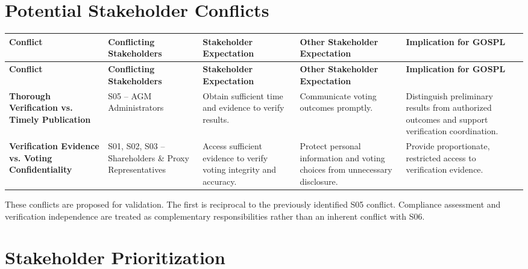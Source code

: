 \documentclass[11pt,a4paper]{article}
\begin{document}
\section*{Potential Stakeholder Conflicts}

\begingroup\small
\begin{longtable}{@{}>{\raggedright\arraybackslash}p{}>{\raggedright\arraybackslash}p{}>{\raggedright\arraybackslash}p{}>{\raggedright\arraybackslash}p{}>{\raggedright\arraybackslash}p{}@{}}
\toprule
\textbf{Conflict} & \textbf{Conflicting Stakeholders} & \textbf{Stakeholder Expectation} & \textbf{Other Stakeholder Expectation} & \textbf{Implication for GOSPL} \\
\midrule
\endfirsthead
\toprule
\textbf{Conflict} & \textbf{Conflicting Stakeholders} & \textbf{Stakeholder Expectation} & \textbf{Other Stakeholder Expectation} & \textbf{Implication for GOSPL} \\
\midrule
\endhead
\bottomrule
\endfoot
\textbf{Thorough Verification vs. Timely Publication} & S05 -- AGM Administrators & Obtain sufficient time and evidence to verify results. & Communicate voting outcomes promptly. & Distinguish preliminary results from authorized outcomes and support verification coordination. \\
\addlinespace
\textbf{Verification Evidence vs. Voting Confidentiality} & S01, S02, S03 -- Shareholders \& Proxy Representatives & Access sufficient evidence to verify voting integrity and accuracy. & Protect personal information and voting choices from unnecessary disclosure. & Provide proportionate, restricted access to verification evidence. \\
\end{longtable}
\endgroup

These conflicts are proposed for validation. The first is reciprocal to the previously identified S05 conflict. Compliance assessment and verification independence are treated as complementary responsibilities rather than an inherent conflict with S06.


\section*{Stakeholder Prioritization}
\end{document}
